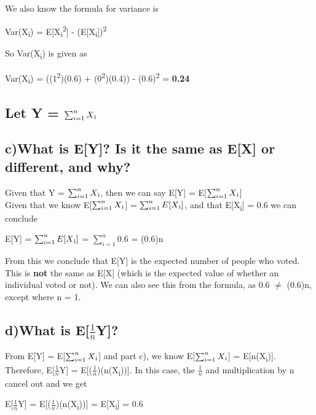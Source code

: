 \documentclass{report}
\begin{document}
		We also know the formula for variance is 
		\begin{center}
			Var(X\textsubscript{i}) = E[X\textsubscript{i}\textsuperscript{2}] - (E[X\textsubscript{i}])\textsuperscript{2}
		\end{center}
		So Var(X\textsubscript{i}) is given as
		\begin{center}
			Var(X\textsubscript{i}) = ((1\textsuperscript{2})(0.6) + (0\textsuperscript{2})(0.4)) - (0.6)\textsuperscript{2} = \textbf{0.24}
		\end{center}
		
		
		
		
	
		\subsection*{Let Y = $\sum_{i=1}^{n} X\textsubscript{i}$}
		
		
		
		
		
		
		
		
		
		\subsection*{c)What is E[Y]? Is it the same as E[X] or different, and why?}
		Given that Y = $\sum_{i=1}^{n} X\textsubscript{i}$, then we can say E[Y] = E[$\sum_{i=1}^{n} X\textsubscript{i}$]\\
		Given that we know E[$\sum_{i=1}^{n} X\textsubscript{i}$] = $\sum_{i=1}^{n} E[X\textsubscript{i}]$, and that 
		E[X\textsubscript{i}] = 0.6 we can conclude
		\begin{center}
			E[Y] = $\sum_{i=1}^{n} E[X\textsubscript{i}]$ = $\sum_{i=1}^{n} 0.6$ = (0.6)n
		\end{center}
		From this we conclude that E[Y] is the expected number of people who voted. This is \textbf{not} the same as E[X] (which is the expected value of whether an individual voted or not). We can also see this from the formula, as 0.6 $\neq$ (0.6)n, except where n = 1.
		
		
		

		\subsection*{d)What is E[$\frac{1}{n}$Y]?}
		From E[Y] = E[$\sum_{i=1}^{n} X\textsubscript{i}$] and part c), we know E[$\sum_{i=1}^{n} X\textsubscript{i}$] = E[n(X\textsubscript{i})].\\
		Therefore, E[$\frac{1}{n}$Y] = E[($\frac{1}{n}$)(n(X\textsubscript{i}))]. In this case, the $\frac{1}{n}$ and multiplication by n cancel out and we get
		\begin{center}
			E[$\frac{1}{n}$Y] = E[($\frac{1}{n}$)(n(X\textsubscript{i}))] = E[X\textsubscript{i}] = 0.6
		\end{center}
		
\end{document}
